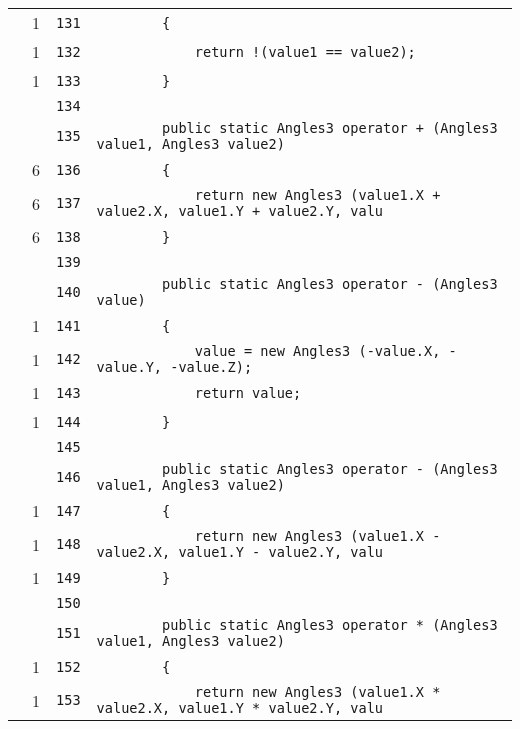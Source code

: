 \documentclass[a4paper,10pt]{article}
\begin{document}
\begin{longtable}[l]{lrrl}
\cellcolor{green} & 1 & \verb~131~ & \verb~        {~\\
\cellcolor{green} & 1 & \verb~132~ & \verb~            return !(value1 == value2);~\\
\cellcolor{green} & 1 & \verb~133~ & \verb~        }~\\
\cellcolor{gray} &  & \verb~134~ & \verb~~\\
\cellcolor{gray} &  & \verb~135~ & \verb~        public static Angles3 operator + (Angles3 value1, Angles3 value2)~\\
\cellcolor{green} & 6 & \verb~136~ & \verb~        {~\\
\cellcolor{green} & 6 & \verb~137~ & \verb~            return new Angles3 (value1.X + value2.X, value1.Y + value2.Y, valu~\\
\cellcolor{green} & 6 & \verb~138~ & \verb~        }~\\
\cellcolor{gray} &  & \verb~139~ & \verb~~\\
\cellcolor{gray} &  & \verb~140~ & \verb~        public static Angles3 operator - (Angles3 value)~\\
\cellcolor{green} & 1 & \verb~141~ & \verb~        {~\\
\cellcolor{green} & 1 & \verb~142~ & \verb~            value = new Angles3 (-value.X, -value.Y, -value.Z);~\\
\cellcolor{green} & 1 & \verb~143~ & \verb~            return value;~\\
\cellcolor{green} & 1 & \verb~144~ & \verb~        }~\\
\cellcolor{gray} &  & \verb~145~ & \verb~~\\
\cellcolor{gray} &  & \verb~146~ & \verb~        public static Angles3 operator - (Angles3 value1, Angles3 value2)~\\
\cellcolor{green} & 1 & \verb~147~ & \verb~        {~\\
\cellcolor{green} & 1 & \verb~148~ & \verb~            return new Angles3 (value1.X - value2.X, value1.Y - value2.Y, valu~\\
\cellcolor{green} & 1 & \verb~149~ & \verb~        }~\\
\cellcolor{gray} &  & \verb~150~ & \verb~~\\
\cellcolor{gray} &  & \verb~151~ & \verb~        public static Angles3 operator * (Angles3 value1, Angles3 value2)~\\
\cellcolor{green} & 1 & \verb~152~ & \verb~        {~\\
\cellcolor{green} & 1 & \verb~153~ & \verb~            return new Angles3 (value1.X * value2.X, value1.Y * value2.Y, valu~\\

\end{longtable}
\end{document}
